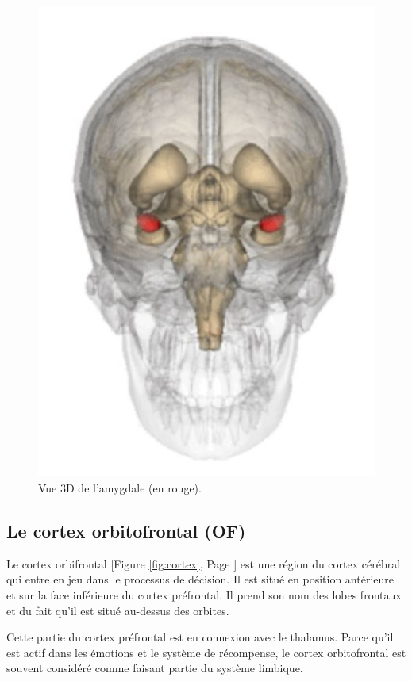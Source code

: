 \begin{figure}[th]
\centering
\includegraphics{Figures/2}
\decoRule
\caption[L'amygdale]{Vue 3D de l'amygdale (en rouge).}
\label{fig:amy}
\end{figure}


\subsection{Le cortex orbitofrontal (OF)}

Le cortex orbifrontal [Figure \ref{fig:cortex}, Page \pageref{fig:cortex}] est une région du cortex cérébral qui entre en jeu dans le processus de décision. Il est situé en position antérieure et sur la face inférieure du cortex préfrontal. Il prend son nom des lobes frontaux et du fait qu'il est situé au-dessus des orbites.


Cette partie du cortex préfrontal est en connexion avec le thalamus. Parce qu'il est actif dans les émotions et le système de récompense, le cortex orbitofrontal est souvent considéré comme faisant partie du système limbique.\parencite{cortex}

